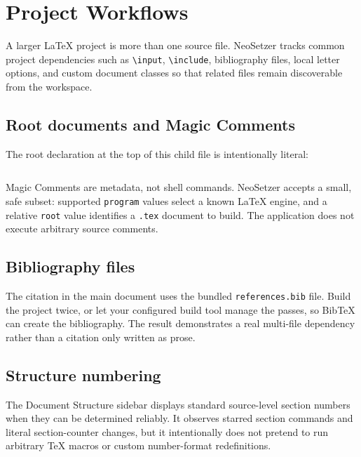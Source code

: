 
\section{Project Workflows}
\label{sec:project-workflows}

A larger LaTeX project is more than one source file. NeoSetzer tracks common
project dependencies such as \texttt{\textbackslash input},
\texttt{\textbackslash include}, bibliography files, local letter options, and
custom document classes so that related files remain discoverable from the
workspace.

\subsection{Root documents and Magic Comments}
\label{sec:project-workflows:magic-comments}

The root declaration at the top of this child file is intentionally literal:
\begin{lstlisting}[language={[LaTeX]TeX}, caption={A child-file build declaration.}]
% !TEX root = ../main.tex
\end{lstlisting}

Magic Comments are metadata, not shell commands. NeoSetzer accepts a small,
safe subset: supported \texttt{program} values select a known LaTeX engine,
and a relative \texttt{root} value identifies a \texttt{.tex} document to
build. The application does not execute arbitrary source comments.

\subsection{Bibliography files}
\label{sec:project-workflows:bibliography}

The citation in the main document uses the bundled \texttt{references.bib}
file. Build the project twice, or let your configured build tool manage the
passes, so BibTeX can create the bibliography. The result demonstrates a real
multi-file dependency rather than a citation only written as prose.

\subsection{Structure numbering}
\label{sec:project-workflows:numbering}

The Document Structure sidebar displays standard source-level section numbers
when they can be determined reliably. It observes starred section commands and
literal section-counter changes, but it intentionally does not pretend to run
arbitrary TeX macros or custom number-format redefinitions.

